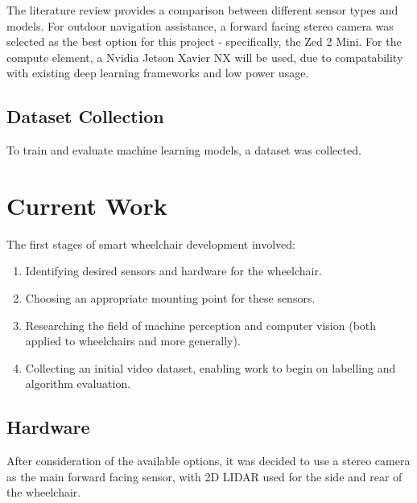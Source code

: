 \documentclass[12pt]{article}
\begin{document}
The literature review provides a comparison between different sensor types and models. For outdoor navigation assistance,
a forward facing stereo camera was selected as the best option for this project - specifically, the Zed 2 Mini.
For the compute element, a Nvidia Jetson Xavier NX will be used, due to compatability with existing deep learning
frameworks and low power usage.

\subsection{Dataset Collection}
To train and evaluate machine learning models, a dataset was collected.
\pagebreak

\section{Current Work}
The first stages of smart wheelchair development involved:
\begin{enumerate}
    \item Identifying desired sensors and hardware for the wheelchair.
    \item Choosing an appropriate mounting point for these sensors.
    \item Researching the field of machine perception and computer vision (both applied to wheelchairs and more generally).
    \item Collecting an initial video dataset, enabling work to begin on labelling and algorithm evaluation.
\end{enumerate}

\subsection{Hardware}




After consideration of the available options, it was decided to use a stereo camera as the main
forward facing sensor, with 2D LIDAR used for the side and rear of the wheelchair.
\end{document}
